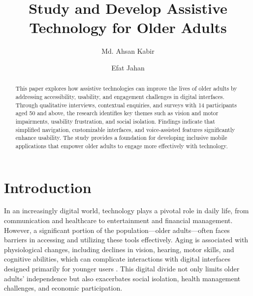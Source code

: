 \documentclass[acmlarge]{acmart}
\begin{document}
\title{Study and Develop Assistive Technology for Older Adults}

\author{Md. Ahsan Kabir}
\author{Efat Jahan}
\authornotemark[1]

\renewcommand{\shortauthors}{Kabir and Jahan}

\begin{abstract}
This paper explores how assistive technologies can improve the lives of older adults by addressing accessibility, usability, and engagement challenges in digital interfaces. Through qualitative interviews, contextual enquiries, and surveys with 14 participants aged 50 and above, the research identifies key themes such as vision and motor impairments, usability frustration, and social isolation. Findings indicate that simplified navigation, customizable interfaces, and voice-assisted features significantly enhance usability. The study provides a foundation for developing inclusive mobile applications that empower older adults to engage more effectively with technology.
\end{abstract}


\maketitle

\section{Introduction}
In an increasingly digital world, technology plays a pivotal role in daily life, from communication and healthcare to entertainment and financial management. However, a significant portion of the population—older adults—often faces barriers in accessing and utilizing these tools effectively. Aging is associated with physiological changes, including declines in vision, hearing, motor skills, and cognitive abilities, which can complicate interactions with digital interfaces designed primarily for younger users \cite{smith2021elderlytech, anderson2019agingtech, barnard2018digitaldivide}. This digital divide not only limits older adults' independence but also exacerbates social isolation, health management challenges, and economic participation.
\end{document}
